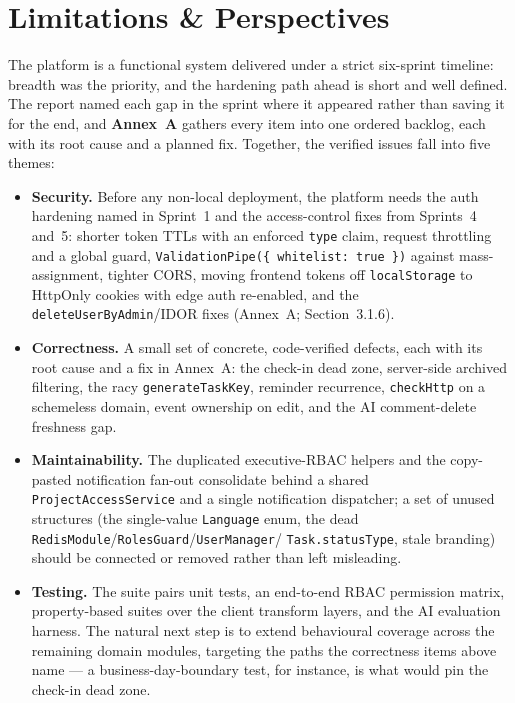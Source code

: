 \section*{Limitations \& Perspectives}

The platform is a functional system delivered under a strict six-sprint timeline: breadth was the priority,
and the hardening path ahead is short and well defined. The report named each gap in the sprint where
it appeared rather than saving it for the end, and \textbf{Annex~A} gathers every item into one ordered backlog,
each with its root cause and a planned fix. Together, the verified
issues fall into five themes:

\begin{itemize}
  \item \textbf{Security.} Before any non-local deployment, the platform needs the auth hardening named in Sprint~1 and
  the access-control fixes from Sprints~4 and~5: shorter token TTLs with an enforced \texttt{type} claim, request
  throttling and a global guard, \texttt{ValidationPipe(\{ whitelist: true \})} against mass-assignment, tighter
  CORS, moving frontend tokens off \texttt{localStorage} to HttpOnly cookies with edge auth re-enabled, and the
  \texttt{deleteUserByAdmin}/IDOR fixes (Annex~A; Section~3.1.6).
  \item \textbf{Correctness.} A small set of concrete, code-verified defects, each with its root cause and a fix in
  Annex~A: the check-in dead zone, server-side archived filtering, the racy \texttt{generateTaskKey},
  reminder recurrence, \texttt{checkHttp} on a schemeless domain, event ownership on edit, and the AI
  comment-delete freshness gap.
  \item \textbf{Maintainability.} The duplicated executive-RBAC helpers and the copy-pasted notification fan-out
  consolidate behind a shared \texttt{ProjectAccessService} and a single notification dispatcher; a set of unused
  structures (the single-value \texttt{Language} enum, the dead \texttt{RedisModule}/\texttt{RolesGuard}/\texttt{UserManager}/
  \texttt{Task.statusType}, stale branding) should be connected or removed rather than left misleading.
  \item \textbf{Testing.} The suite pairs unit tests, an end-to-end RBAC permission matrix, property-based
  suites over the client transform layers, and the AI evaluation harness. The natural next step is to
  extend behavioural coverage across the remaining domain modules, targeting the paths the correctness
  items above name --- a business-day-boundary test, for instance, is what would pin the check-in dead zone.

\end{itemize}
